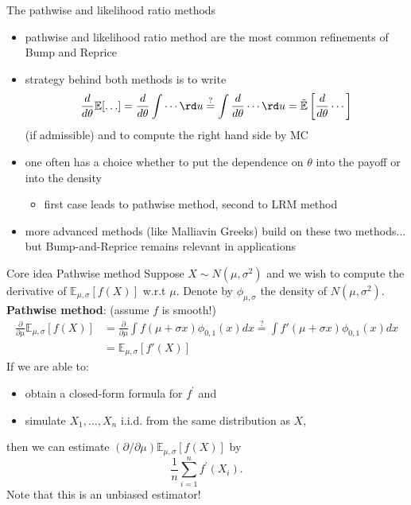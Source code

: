 \documentclass[pdf, handout]{beamer}
\begin{document}
\begin{frame}{The pathwise and likelihood ratio methods}
\begin{itemize}
\item
pathwise and likelihood ratio method are the most common refinements of Bump and Reprice
\item strategy behind both methods is to write
\[
\frac{d}{d\theta} \mathbb{E}[\ldots] =
\frac{d}{d\theta} \int \cdots  \rd u
\stackrel{?}{=} \int \frac{d}{d\theta}\cdots   \rd u
=  \tilde{\mathbb{E}}\left[\frac{d}{d\theta} \cdots\right]
\]
(if admissible) and to compute the right hand side by MC
\item one often has a choice whether to put the dependence on $\theta$ into the payoff or into the density
\begin{itemize}
\item
 first case leads to pathwise method,  second to  LRM method
 \end{itemize} 
\item more advanced methods (like Malliavin Greeks) build on these two methods... but Bump-and-Reprice remains relevant in applications
\end{itemize}
\end{frame}


\begin{frame}{Core idea Pathwise method}
Suppose $X \sim N(\mu,\sigma^2)$ and we wish to compute the derivative of $\mathbb{E}_{\mu,\sigma}[f(X)]$ w.r.t $\mu$. Denote by $\phi_{\mu,\sigma}$ the density of $N(\mu,\sigma^2)$.
\vskip4mm
\textbf{Pathwise method}: (assume $f$ is smooth!)
\begin{align*}
\frac{\partial}{\partial\mu} \mathbb{E}_{\mu,\sigma}[f(X)] &= \frac{\partial}{\partial\mu} \int f(\mu+\sigma x) \phi_{0,1}(x) dx \stackrel{?}{=} \int f'(\mu+\sigma x) \phi_{0,1}(x) dx \\
&= \mathbb{E}_{\mu,\sigma}[ f'(X)]
\end{align*} 
If we are able to:
\begin{itemize}
\item obtain a closed-form formula for $f^\prime$ and
\item simulate $X_1,\dots,X_n$ i.i.d. from the same distribution as $X$,
\end{itemize}
then we can estimate $(\partial/\partial\mu) \mathbb{E}_{\mu,\sigma}[f(X)]$ by
\[
\frac{1}{n}\sum_{i=1}^n f^\prime(X_i).
\]
Note that this is an unbiased estimator!
\end{frame}
\end{document}
